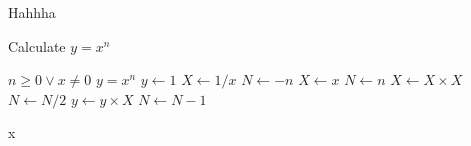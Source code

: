 \documentclass[10pt, a4paper, twocolumn]{article}
\begin{document}
Hahhha

\begin{algorithm}
\caption{Calculate $y = x^n$}
\label{alg1}
\begin{algorithmic}
\REQUIRE $n \geq 0 \vee x \neq 0$
\ENSURE $y = x^n$
\STATE $y \leftarrow 1$
\STATE $X \leftarrow 1 / x$
\STATE $N \leftarrow -n$
\ELSE
\STATE $X \leftarrow x$
\STATE $N \leftarrow n$
\ENDIF
{}
\STATE $X \leftarrow X \times X$
\STATE $N \leftarrow N / 2$
\ELSE[$N$ is odd]
\STATE $y \leftarrow y \times X$
\STATE $N \leftarrow N - 1$
\ENDIF
\ENDWHILE
\end{algorithmic}
\end{algorithm}
x\\

\begin{figure}
\centering
{}

\end{figure}
\end{document}
